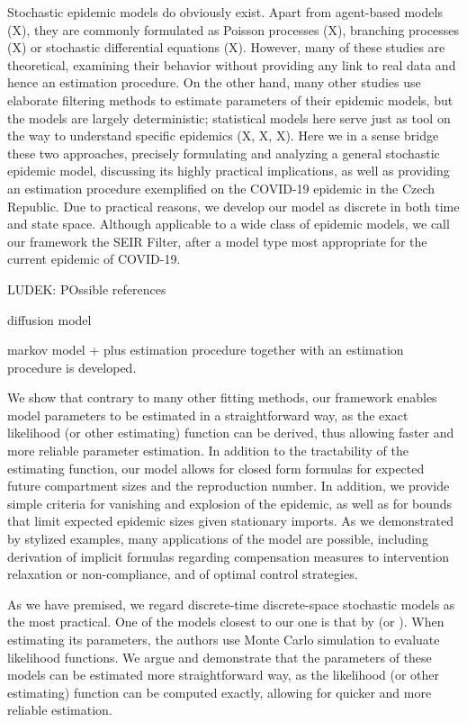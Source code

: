 \documentclass[english]{elsarticle}
\theoremstyle{plain}
\theoremstyle{remark}
\theoremstyle{plain}
\theoremstyle{definition}
\begin{document}
Stochastic epidemic models do obviously exist. Apart from agent-based models (X), they are commonly formulated as Poisson processes (X), branching processes (X) or stochastic differential equations (X). However, many of these studies are theoretical, examining their behavior without providing any link to real data and hence an estimation procedure. On the other hand, many other studies use elaborate filtering methods to estimate parameters of their epidemic models, but the models are largely deterministic; statistical models here serve just as tool on the way to understand specific epidemics (X, X, X). Here we in a sense bridge these two approaches, precisely formulating and analyzing a general stochastic epidemic model, discussing its highly practical implications, as well as providing an estimation procedure exemplified on the COVID-19 epidemic in the Czech Republic. Due to practical reasons, we develop our model as discrete in both time and state space. Although applicable to a wide class of epidemic models, we call our framework the SEIR Filter, after a model type most appropriate for the current epidemic of COVID-19.

LUDEK: POssible references 

\cite{farnoosh2017stochastic} diffusion model

 \cite{gibson1998estimating} markov model + plus estimation procedure
together with an estimation procedure is developed. 


We show that contrary to many other fitting methods, our framework enables model parameters to be estimated in a straightforward way, as the exact likelihood (or other estimating) function can be derived, thus allowing faster and more reliable parameter estimation. In addition to the tractability of the estimating function, our model allows for closed form formulas for expected future compartment sizes and the reproduction number. In addition, we provide simple criteria for vanishing and explosion of the epidemic, as well as for bounds that limit expected epidemic sizes given stationary imports. As we demonstrated by stylized examples, many applications of the model are possible, including derivation of implicit formulas regarding compensation measures to intervention relaxation or non-compliance, and of optimal control strategies.

As we have premised, we regard discrete-time discrete-space stochastic
models as the most practical. One of the models closest to our one
is that by \cite{kucharski2020early} (or \cite{prem2020effect}).
When estimating its parameters, the authors use Monte Carlo simulation
to evaluate likelihood functions. We argue and demonstrate that the
parameters of these models can be estimated more straightforward way,
as the likelihood (or other estimating) function can be computed exactly,
allowing for quicker and more reliable estimation.
\end{document}
